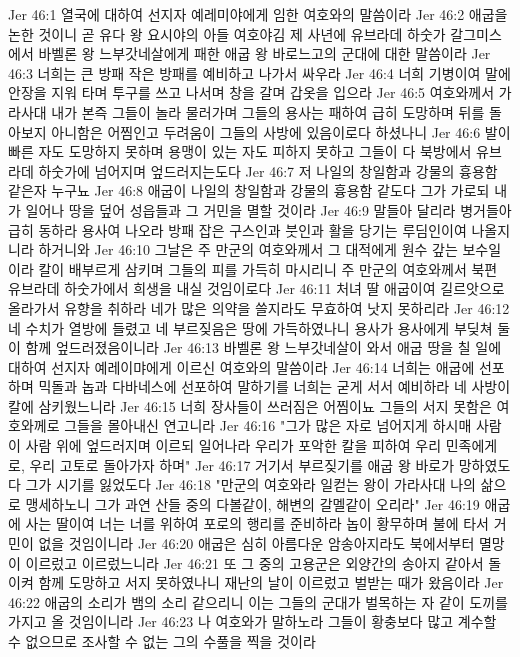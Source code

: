 Jer 46:1  열국에 대하여 선지자 예레미야에게 임한 여호와의 말씀이라
Jer 46:2  애굽을 논한 것이니 곧 유다 왕 요시야의 아들 여호야김 제 사년에 유브라데 하숫가 갈그미스에서 바벨론 왕 느부갓네살에게 패한 애굽 왕 바로느고의 군대에 대한 말씀이라
Jer 46:3  너희는 큰 방패 작은 방패를 예비하고 나가서 싸우라
Jer 46:4  너희 기병이여 말에 안장을 지워 타며 투구를 쓰고 나서며 창을 갈며 갑옷을 입으라
Jer 46:5  여호와께서 가라사대 내가 본즉 그들이 놀라 물러가며 그들의 용사는 패하여 급히 도망하며 뒤를 돌아보지 아니함은 어찜인고 두려움이 그들의 사방에 있음이로다 하셨나니
Jer 46:6  발이 빠른 자도 도망하지 못하며 용맹이 있는 자도 피하지 못하고 그들이 다 북방에서 유브라데 하숫가에 넘어지며 엎드러지는도다
Jer 46:7  저 나일의 창일함과 강물의 흉용함 같은자 누구뇨
Jer 46:8  애굽이 나일의 창일함과 강물의 흉용함 같도다 그가 가로되 내가 일어나 땅을 덮어 성읍들과 그 거민을 멸할 것이라
Jer 46:9  말들아 달리라 병거들아 급히 동하라 용사여 나오라 방패 잡은 구스인과 붓인과 활을 당기는 루딤인이여 나올지니라 하거니와
Jer 46:10  그날은 주 만군의 여호와께서 그 대적에게 원수 갚는 보수일이라 칼이 배부르게 삼키며 그들의 피를 가득히 마시리니 주 만군의 여호와께서 북편 유브라데 하숫가에서 희생을 내실 것임이로다
Jer 46:11  처녀 딸 애굽이여 길르앗으로 올라가서 유향을 취하라 네가 많은 의약을 쓸지라도 무효하여 낫지 못하리라
Jer 46:12  네 수치가 열방에 들렸고 네 부르짖음은 땅에 가득하였나니 용사가 용사에게 부딪쳐 둘이 함께 엎드러졌음이니라
Jer 46:13  바벨론 왕 느부갓네살이 와서 애굽 땅을 칠 일에 대하여 선지자 예레이먀에게 이르신 여호와의 말씀이라
Jer 46:14  너희는 애굽에 선포하며 믹돌과 놉과 다바네스에 선포하여 말하기를 너희는 굳게 서서 예비하라 네 사방이 칼에 삼키웠느니라
Jer 46:15  너희 장사들이 쓰러짐은 어찜이뇨 그들의 서지 못함은 여호와께로 그들을 몰아내신 연고니라
Jer 46:16  "그가 많은 자로 넘어지게 하시매 사람이 사람 위에 엎드러지며 이르되 일어나라 우리가 포악한 칼을 피하여 우리 민족에게로, 우리 고토로 돌아가자 하며"
Jer 46:17  거기서 부르짖기를 애굽 왕 바로가 망하였도다 그가 시기를 잃었도다
Jer 46:18  "만군의 여호와라 일컫는 왕이 가라사대 나의 삶으로 맹세하노니 그가 과연 산들 중의 다볼같이, 해변의 갈멜같이 오리라"
Jer 46:19  애굽에 사는 딸이여 너는 너를 위하여 포로의 행리를 준비하라 놉이 황무하며 불에 타서 거민이 없을 것임이니라
Jer 46:20  애굽은 심히 아름다운 암송아지라도 북에서부터 멸망이 이르렀고 이르렀느니라
Jer 46:21  또 그 중의 고용군은 외양간의 송아지 같아서 돌이켜 함께 도망하고 서지 못하였나니 재난의 날이 이르렀고 벌받는 때가 왔음이라
Jer 46:22  애굽의 소리가 뱀의 소리 같으리니 이는 그들의 군대가 벌목하는 자 같이 도끼를 가지고 올 것임이니라
Jer 46:23  나 여호와가 말하노라 그들이 황충보다 많고 계수할 수 없으므로 조사할 수 없는 그의 수풀을 찍을 것이라
